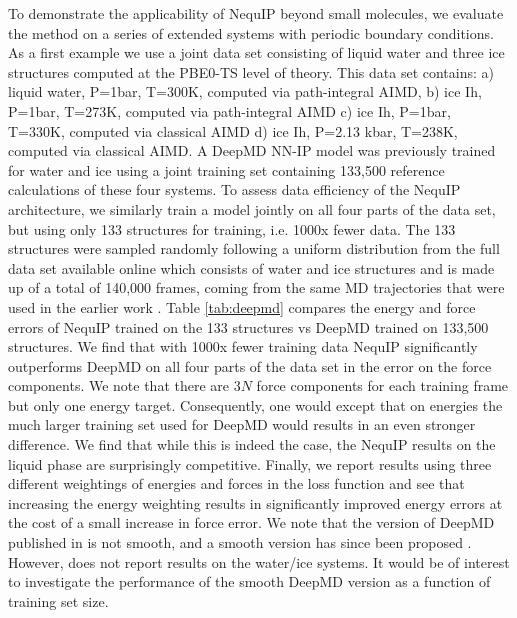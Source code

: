 \documentclass[%
reprint,
superscriptaddress,
nofootinbib,
amsmath,amssymb,
aps,
prl,
]{revtex4-1}
\begin{document}
To demonstrate the applicability of NequIP beyond small molecules, we evaluate the method on a series of extended systems with periodic boundary conditions. As a first example we use a joint data set consisting of liquid water and three ice structures \cite{deepmd, deepmd_water_paper} computed at the PBE0-TS level of theory. This data set \cite{deepmd} contains: a) liquid water, P=1bar, T=300K, computed via path-integral AIMD, b) ice Ih, P=1bar, T=273K, computed via path-integral AIMD c) ice Ih, P=1bar, T=330K, computed via classical AIMD d) ice Ih, P=2.13 kbar, T=238K, computed via classical AIMD. A DeepMD NN-IP model was previously trained \cite{deepmd} for water and ice using a joint training set containing 133,500 reference calculations of these four systems. To assess data efficiency of the NequIP architecture, we similarly train a model jointly on all four parts of the data set, but using only 133 structures for training, i.e. 1000x fewer data. The 133 structures were sampled randomly following a uniform distribution from the full data set available online which consists of water and ice structures and is made up of a total of 140,000 frames, coming from the same MD trajectories that were used in the earlier work \cite{deepmd}. Table \ref{tab:deepmd} compares the energy and force errors of NequIP trained on the 133 structures vs DeepMD trained on 133,500 structures.  We find that with 1000x fewer training data NequIP significantly outperforms DeepMD on all four parts of the data set in the error on the force components. We note that there are $3N$ force components for each training frame but only one energy target. Consequently, one would except that on energies the much larger training set used for DeepMD would results in an even stronger difference. We find that while this is indeed the case, the NequIP results on the liquid phase are surprisingly competitive. Finally, we report results using three different weightings of energies and forces in the loss function and see that increasing the energy weighting results in significantly improved energy errors at the cost of a small increase in force error. We note that the version of DeepMD published in \cite{deepmd} is not smooth, and a smooth version has since been proposed \cite{zhang2018end}. However, \cite{zhang2018end} does not report results on the water/ice systems. It would be of interest to investigate the performance of the smooth DeepMD version as a function of training set size.
\end{document}
